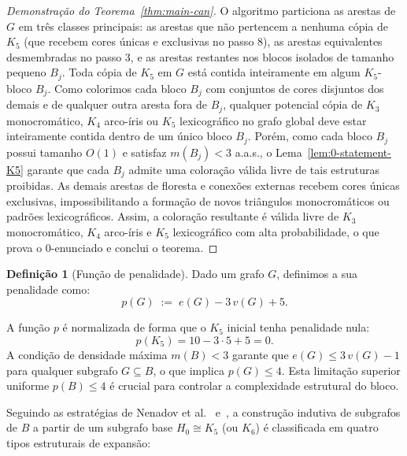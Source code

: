 \documentclass[reqno, 12pt]{amsart}
\numberwithin{equation}{section}
\theoremstyle{plain}
\theoremstyle{definition}
\newtheorem{definition}[theorem]{Definição}
\newcommand{\maxdens}{m}
\newcommand{\whp}{a.a.s.}
\begin{document}
\begin{proof}[Demonstração do Teorema~\ref{thm:main-can}]
    O algoritmo particiona as arestas de $G$ em três classes principais: as arestas que não pertencem a nenhuma cópia de $K_5$ (que recebem cores únicas e exclusivas no passo 8), as arestas equivalentes desmembradas no passo 3, e as arestas restantes nos blocos isolados de tamanho pequeno $B_j$.
    Toda cópia de $K_5$ em $G$ está contida inteiramente em algum $K_5$-bloco $B_j$. Como colorimos cada bloco $B_j$ com conjuntos de cores disjuntos dos demais e de qualquer outra aresta fora de $B_j$, qualquer potencial cópia de $K_3$ monocromático, $K_4$ arco-íris ou $K_5$ lexicográfico no grafo global deve estar inteiramente contida dentro de um único bloco $B_j$.
    Porém, como cada bloco $B_j$ possui tamanho $O(1)$ e satisfaz $\maxdens(B_j) < 3$ \whp, o Lema~\ref{lem:0-statement-K5} garante que cada $B_j$ admite uma coloração válida livre de tais estruturas proibidas. As demais arestas de floresta e conexões externas recebem cores únicas exclusivas, impossibilitando a formação de novos triângulos monocromáticos ou padrões lexicográficos.
    Assim, a coloração resultante é válida livre de $K_3$ monocromático, $K_4$ arco-íris e $K_5$ lexicográfico com alta probabilidade, o que prova o $0$-enunciado e conclui o teorema.
\end{proof}

\begin{definition}[Função de penalidade]
    \label{def:penalidade}
    Dado um grafo $G$, definimos a sua penalidade como:
    \[
        p(G) \;:=\; e(G) - 3\,v(G) + 5.
    \]
\end{definition}

A função $p$ é normalizada de forma que o $K_5$ inicial tenha penalidade nula:
\[
    p(K_5) = 10 - 3 \cdot 5 + 5 = 0.
\]
A condição de densidade máxima $\maxdens(B) < 3$ garante que $e(G) \le 3\,v(G) - 1$ para qualquer subgrafo $G \subseteq B$, o que implica $p(G) \le 4$. Esta limitação superior uniforme $p(B) \le 4$ é crucial para controlar a complexidade estrutural do bloco.

Seguindo as estratégias de Nenadov et al.~\cite{nenadov2017algorithmic} e~\cite{AntiComplete}, a construção indutiva de subgrafos de $B$ a partir de um subgrafo base $H_0 \cong K_5$ (ou $K_6$) é classificada em quatro tipos estruturais de expansão:
\end{document}
